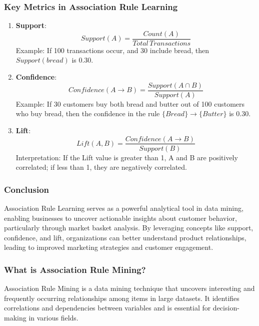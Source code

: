 \documentclass{beamer}
\begin{document}
\begin{frame}[fragile]
    \frametitle{Key Metrics in Association Rule Learning}
    \begin{enumerate}
        \item \textbf{Support}:
        \begin{equation*}
        Support(A) = \frac{Count(A)}{Total \, Transactions}
        \end{equation*}
        Example: If 100 transactions occur, and 30 include bread, then $Support(bread)$ is 0.30.
        
        \item \textbf{Confidence}:
        \begin{equation*}
        Confidence(A \rightarrow B) = \frac{Support(A \cap B)}{Support(A)}
        \end{equation*}
        Example: If 30 customers buy both bread and butter out of 100 customers who buy bread, then the confidence in the rule $\{Bread\} \rightarrow \{Butter\}$ is 0.30.
        
        \item \textbf{Lift}:
        \begin{equation*}
        Lift(A, B) = \frac{Confidence(A \rightarrow B)}{Support(B)}
        \end{equation*}
        Interpretation: If the Lift value is greater than 1, A and B are positively correlated; if less than 1, they are negatively correlated.
    \end{enumerate}
\end{frame}

\begin{frame}[fragile]
    \frametitle{Conclusion}
    Association Rule Learning serves as a powerful analytical tool in data mining, enabling businesses to uncover actionable insights about customer behavior, particularly through market basket analysis. By leveraging concepts like support, confidence, and lift, organizations can better understand product relationships, leading to improved marketing strategies and customer engagement.
\end{frame}

\begin{frame}[fragile]
    \frametitle{What is Association Rule Mining?}
    Association Rule Mining is a data mining technique that uncovers interesting and frequently occurring relationships among items in large datasets. It identifies correlations and dependencies between variables and is essential for decision-making in various fields.
\end{frame}
\end{document}
